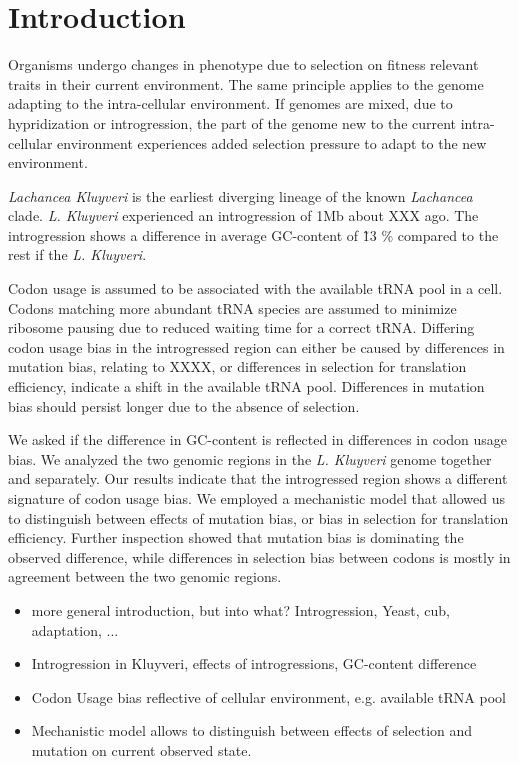 \documentclass[12pt,draft]{article}
\begin{document}
\doublespacing
\linenumbers


\section*{Introduction}

Organisms undergo changes in phenotype due to selection on fitness relevant traits in their current environment. 
The same principle applies to the genome adapting to the intra-cellular environment.
If genomes are mixed, due to hypridization or introgression, the part of the genome new to the current intra-cellular environment experiences added selection pressure to adapt to the new environment.

\textit{Lachancea Kluyveri} is the earliest diverging lineage of the known \textit{Lachancea} clade. 
\textit{L. Kluyveri} experienced an introgression of 1Mb about XXX ago. 
The introgression shows a difference in average GC-content of \~ 13 \% compared to the rest if the \textit{L. Kluyveri}.

Codon usage is assumed to be associated with the available tRNA pool in a cell. 
Codons matching more abundant tRNA species are assumed to minimize ribosome pausing due to reduced waiting time for a correct tRNA. 
Differing codon usage bias in the introgressed region can either be caused by differences in mutation bias, relating to XXXX, or differences in selection for translation efficiency, indicate a shift in the available tRNA pool.
Differences in mutation bias should persist longer due to the absence of selection.   

We asked if the difference in GC-content is reflected in differences in codon usage bias.
We analyzed the two genomic regions in the \textit{L. Kluyveri} genome together and separately.
Our results indicate that the introgressed region shows a different signature of codon usage bias.
We employed a mechanistic model that allowed us to distinguish between effects of mutation bias, or bias in selection for translation efficiency.
Further inspection showed that mutation bias is dominating the observed difference, while differences in selection bias between codons is mostly in agreement between the two genomic regions. 

\begin{itemize}
	\item more general introduction, but into what? Introgression, Yeast, cub, adaptation, ...
	\item Introgression in Kluyveri, effects of introgressions, GC-content difference
	\item Codon Usage bias reflective of cellular environment, e.g. available tRNA pool
	\item Mechanistic model allows to distinguish between effects of selection and mutation on current observed state.
\end{itemize}
	
\end{document}

